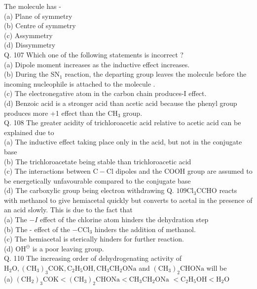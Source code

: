 \documentclass[10pt]{article}
\begin{document}
The molecule has -\\
(a) Plane of symmetry\\
(b) Centre of symmetry\\
(c) Assymmetry\\
(d) Dissymmetry\\
Q. 107 Which one of the following statements is incorrect ?\\
(a) Dipole moment increases as the inductive effect increases.\\
(b) During the $\mathrm{SN}_{1}$ reaction, the departing group leaves the molecule before the incoming nucleophile is attached to the molecule .\\
(c) The electronegative atom in the carbon chain produces-I effect.\\
(d) Benzoic acid is a stronger acid than acetic acid because the phenyl group produces more +1 effect than the $\mathrm{CH}_{3}$ group.\\
Q. 108 The greater acidity of trichloroacetic acid relative to acetic acid can be explained due to\\
(a) The inductive effect taking place only in the acid, but not in the conjugate base\\
(b) The trichloroacetate being stable than trichloroacetic acid\\
(c) The interactions between $\mathrm{C}-\mathrm{Cl}$ dipoles and the COOH group are assumed to be energetically unfavourable compared to the conjugate base\\
(d) The carboxylic group being electron withdrawing Q. $109 \mathrm{Cl}_{3} \mathrm{CCHO}$ reacts with methanol to give hemiacetal quickly but converts to acetal in the presence of an acid slowly. This is due to the fact that\\
(a) The $-I$ effect of the chlorine atom hinders the dehydration step\\
(b) The - effect of the $-\mathrm{CCl}_{3}$ hinders the addition of methanol.\\
(c) The hemiacetal is sterically hinders for further reaction.\\
(d) $\mathrm{OH}^{\ominus}$ is a poor leaving group.\\
Q. 110 The increasing order of dehydrogenating activity of $\mathrm{H}_{2} \mathrm{O},\left(\mathrm{CH}_{3}\right)_{3} \mathrm{COK}, \mathrm{C}_{2} \mathrm{H}_{5} \mathrm{OH}, \mathrm{CH}_{3} \mathrm{CH}_{2} \mathrm{ONa}$ and $\left(\mathrm{CH}_{3}\right)_{2} \mathrm{CHONa}$ will be\\
(a) $\left(\mathrm{CH}_{2}\right)_{3} \mathrm{COK}<\left(\mathrm{CH}_{3}\right)_{2} \mathrm{CHONa}<\mathrm{CH}_{3} \mathrm{CH}_{2} \mathrm{ONa}$ $<\mathrm{C}_{2} \mathrm{H}_{5} \mathrm{OH}<\mathrm{H}_{2} \mathrm{O}$\\
\end{document}
